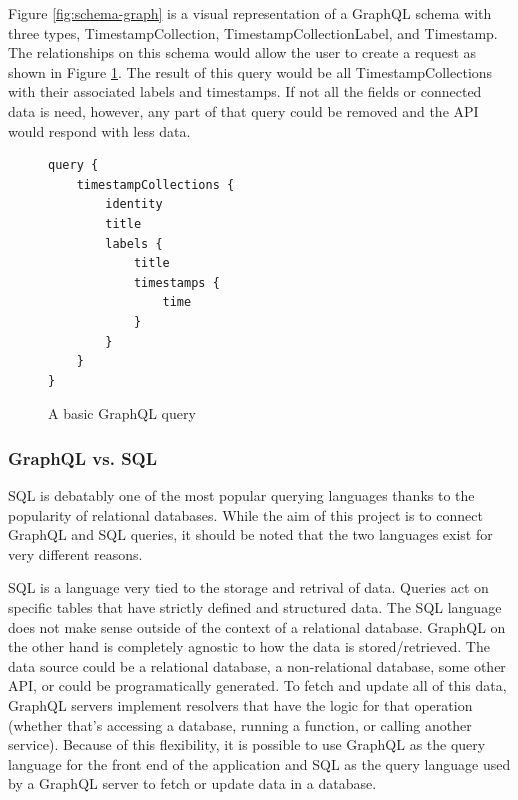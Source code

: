 Figure \ref{fig:schema-graph} is a visual representation of a GraphQL schema with three types, TimestampCollection, TimestampCollectionLabel, and Timestamp.  The relationships on this schema would allow the user to create a request as shown in Figure \ref{fig:basic-query}.  The result of this query would be all TimestampCollections with their associated labels and timestamps.  If not all the fields or connected data is need, however, any part of that query could be removed and the API would respond with less data.

\begin{figure}
    \begin{verbatim}
query {
    timestampCollections {
        identity
        title
        labels {
            title
            timestamps {
                time
            }
        }
    }
}
    \end{verbatim}
    \caption{A basic GraphQL query}
    \label{fig:basic-query}
\end{figure}

\subsubsection{GraphQL vs. SQL}

SQL is debatably one of the most popular querying languages thanks to the popularity of relational databases.  While the aim of this project is to connect GraphQL and SQL queries, it should be noted that the two languages exist for very different reasons.

SQL is a language very tied to the storage and retrival of data.  Queries act on specific tables that have strictly defined and structured data.  The SQL language does not make sense outside of the context of a relational database.  GraphQL on the other hand is completely agnostic to how the data is stored/retrieved.  The data source could be a relational database, a non-relational database, some other API, or could be programatically generated. To fetch and update all of this data, GraphQL servers implement resolvers that have the logic for that operation (whether that's accessing a database, running a function, or calling another service).  Because of this flexibility, it is possible to use GraphQL as the query language for the front end of the application and SQL as the query language used by a GraphQL server to fetch or update data in a database.